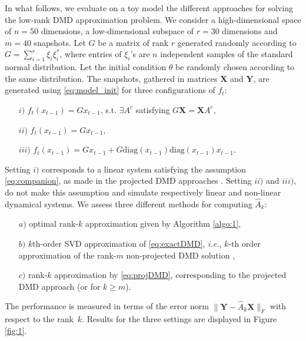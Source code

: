 \documentclass{article}
\newcommand{\AAA}{\mathbf{X}}
\newcommand{\BBB}{\mathbf{Y}}
\newcommand{\ie}{\textit{i.e.}, }
\def\remCH#1{{\noindent\color{red}{{\footnotesize [CH: #1]}}}}
\begin{document}
In what follows, we evaluate on a toy model the different  approaches for solving the low-rank DMD approximation problem. 
We consider a high-dimensional space of $n=50$ dimensions, a low-dimensional subspace of $r=30$ dimensions and  $m=40$ snapshots. Let $G$ %
be a matrix of rank $r$ generated randomly according to  $G=\sum_{i=1}^{r} \xi_i \xi_i^*$, %
where entries of $\xi_i$'s are $n$ independent samples of the standard normal distribution.   Let  the initial condition $\theta$ be randomly chosen according to the same distribution.  The snapshots, gathered in matrices $\AAA$ and $\BBB$, are generated using  \eqref{eq:model_init} %
for three  configurations of $f_t$:   \vspace{-0.2cm}
\begin{itemize}
\item[$i)$] $f_t(x_{t-1})=G x_{t-1}$, s.t. $\exists A^c$ satisfying $G \AAA=\AAA  A^c$,\vspace{-0.15cm}
\item[$ii)$]  $f_t(x_{t-1})=G x_{t-1}$,\vspace{-0.15cm}
\item[$iii)$]  $f_t(x_{t-1})=G x_{t-1}+G \textrm{diag}(x_{t-1})\textrm{diag}(x_{t-1})x_{t-1}$.\vspace{-0.15cm}
\end{itemize}
Setting $i)$  corresponds to a linear system satisfying the  assumption  \eqref{eq:companion}, as made in the projected DMD approaches \cite{Schmid10,Jovanovic12}. Setting $ii)$ and $iii)$, do not make this assumption and simulate respectively linear and non-linear dynamical systems.
We assess three different methods for computing $\hat A_k$: \vspace{-0.1cm}
\begin{itemize}
\item[$a)$]  optimal rank-$k$ approximation  given by Algorithm \ref{algo:1},\vspace{-0.1cm}
\item[$b)$] $k$th-order SVD approximation of  \eqref{eq:exactDMD}, \ie $k$-th order approximation of the rank-$m$ non-projected DMD solution  \cite{Tu2014391},\vspace{-0.1cm}
\item[$c)$]  rank-$k$ approximation by \eqref{eq:projDMD}, corresponding to the projected DMD approach \cite{Jovanovic12} (or \cite{Schmid10} for $k\ge m$).\vspace{-0.1cm}
\end{itemize}
The performance is measured in terms of the error norm $\|\BBB-\hat A_k \AAA\|_F$ with respect to  the rank~$k$. Results for the three settings are displayed in Figure \ref{fig:1}. %
\end{document}
